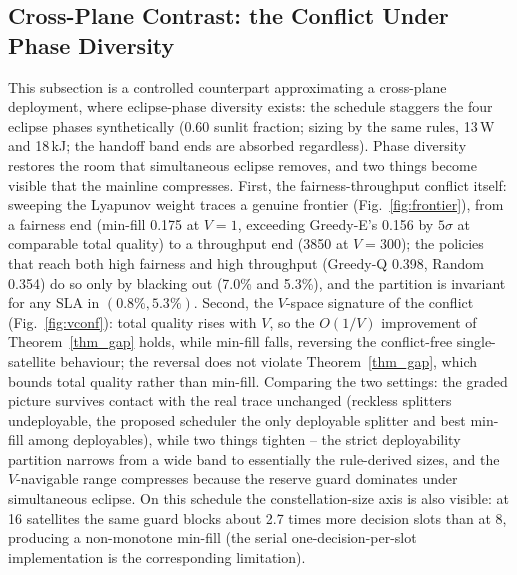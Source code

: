 \subsection{Cross-Plane Contrast: the Conflict Under Phase Diversity}\label{EV_VCONF}
This subsection is a controlled counterpart approximating a cross-plane
deployment, where eclipse-phase diversity exists: the schedule staggers the
four eclipse phases synthetically (0.60 sunlit fraction; sizing by the same
rules, 13\,W and 18\,kJ; the handoff band ends are absorbed regardless).
Phase diversity restores the room that simultaneous eclipse removes, and two
things become visible that the mainline compresses. First, the
fairness-throughput conflict itself: sweeping the Lyapunov weight traces a
genuine frontier (Fig.~\ref{fig:frontier}), from a fairness end (min-fill
0.175 at $V{=}1$, exceeding Greedy-E's 0.156 by $5\sigma$ at comparable total
quality) to a throughput end (3850 at $V{=}300$); the policies that reach both
high fairness and high throughput (Greedy-Q 0.398, Random 0.354) do so only by
blacking out (7.0\% and 5.3\%), and the partition is invariant for any SLA in
$(0.8\%, 5.3\%)$. Second, the $V$-space signature of the conflict
(Fig.~\ref{fig:vconf}): total quality rises with $V$, so the $O(1/V)$
improvement of Theorem~\ref{thm_gap} holds, while min-fill falls, reversing
the conflict-free single-satellite behaviour; the reversal does not violate
Theorem~\ref{thm_gap}, which bounds total quality rather than min-fill.
Comparing the two settings: the graded picture survives contact with the real
trace unchanged (reckless splitters undeployable, the proposed scheduler the
only deployable splitter and best min-fill among deployables), while two
things tighten -- the strict deployability partition narrows from a wide band
to essentially the rule-derived sizes, and the $V$-navigable range compresses
because the reserve guard dominates under simultaneous eclipse. On this
schedule the constellation-size axis is also visible: at 16 satellites the
same guard blocks about 2.7 times more decision slots than at 8, producing a
non-monotone min-fill (the serial one-decision-per-slot implementation is the
corresponding limitation).

